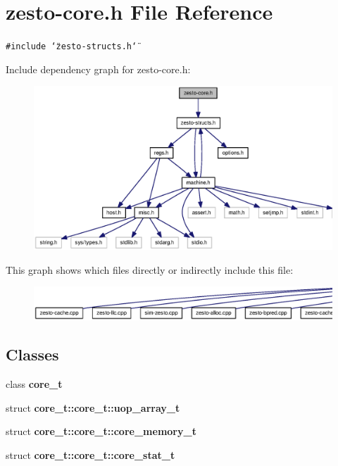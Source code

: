 \section{zesto-core.h File Reference}
\label{zesto-core_8h}
{\tt \#include \char`\"{}zesto-structs.h\char`\"{}}\par


Include dependency graph for zesto-core.h:\nopagebreak
\begin{figure}[H]
\begin{center}
\leavevmode
\includegraphics[width=333pt]{zesto-core_8h__incl}
\end{center}
\end{figure}


This graph shows which files directly or indirectly include this file:\nopagebreak
\begin{figure}[H]
\begin{center}
\leavevmode
\includegraphics[width=420pt]{zesto-core_8h__dep__incl}
\end{center}
\end{figure}
\subsection*{Classes}
\begin{CompactItemize}
\item 
class {\bf core\_\-t}
\item 
struct {\bf core\_\-t::core\_\-t::uop\_\-array\_\-t}
\item 
struct {\bf core\_\-t::core\_\-t::core\_\-memory\_\-t}
\item 
struct {\bf core\_\-t::core\_\-t::core\_\-stat\_\-t}
\end{CompactItemize}
